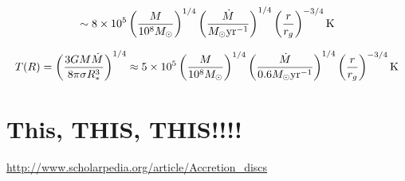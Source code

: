 \documentclass[11pt,a4paper]{article}
\begin{document}
\smallskip
\smallskip
\noindent
\begin{equation*}
  \sim 8 \times 10^{5}    \left(   \frac{M}{10^{8} M_{\odot}}   \right  )^{1/4}  \left(  \frac{\dot{M}}{M_{\odot} {\rm yr^{-1}}}  \right )^{1/4} \left ( \frac{r}{r_{g}} \right )^{-3/4}  {\rm K} \\
\end{equation*}

\smallskip
\smallskip
\noindent
\begin{equation*}
T(R) = \left ( \frac{3 G M \dot{M}}{8 \pi \sigma R^{3}_{*}}  \right )^{1/4}   
  \approx 5 \times 10^{5}    \left(   \frac{M}{10^{8} M_{\odot}}   \right  )^{1/4}  \left(  \frac{\dot{M}}{0.6 M_{\odot} {\rm yr^{-1}}}  \right )^{1/4} \left ( \frac{r}{r_{g}} \right )^{-3/4}  {\rm K} \\
\end{equation*}


\section{This, THIS, THIS!!!!}
\href{http://www.scholarpedia.org/article/Accretion\_discs}{http://www.scholarpedia.org/article/Accretion\_discs}





\end{document}
